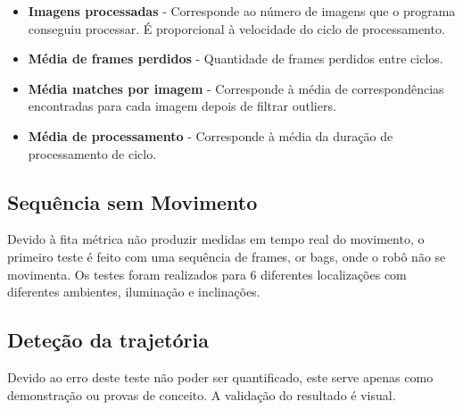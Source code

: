 \begin{itemize}
	\item \textbf{Imagens processadas} - Corresponde ao número de imagens que o programa conseguiu processar. É proporcional à velocidade do ciclo de processamento.
	\item \textbf{Média de frames perdidos} - Quantidade de frames perdidos entre ciclos.
	\item \textbf{Média matches por imagem} - Corresponde à média de correspondências encontradas para cada imagem depois de filtrar outliers.
	\item \textbf{Média de processamento} - Corresponde à média da duração de processamento de ciclo.
\end{itemize}


\subsection{Sequência sem Movimento}

Devido à fita métrica não produzir medidas em tempo real do movimento, o primeiro teste é feito com uma sequência de frames, or bags, onde o robô não se movimenta. Os testes foram realizados para 6 diferentes localizações com diferentes ambientes, iluminação e inclinações.

\subsection{Deteção da trajetória}

Devido ao erro deste teste não poder ser quantificado, este serve apenas como demonstração ou provas de conceito. A validação do resultado é visual.

